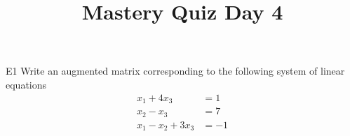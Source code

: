 \documentclass{sbgLAquiz}
\title{Mastery Quiz Day 4 }
\begin{document}
\begin{problem}{E1}
Write an augmented matrix corresponding to the following system of linear equations
\begin{align*}
x_1+4x_3 &= 1 \\
x_2-x_3 &= 7 \\
x_1-x_2+3x_3 &= -1
\end{align*}
\end{problem}
\end{document}
